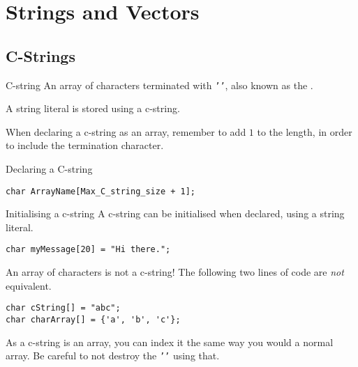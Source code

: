 \documentclass[\main/notes.tex]{subfiles}
\begin{document}
	\setcounter{chapter}{2}
	\chapter{Strings and Vectors}
		\section{C-Strings}
			\begin{definition}{C-string}
				An array of characters terminated with \texttt{'\0'}, also known as the .
			\end{definition}
			A string literal is stored using a c-string.

			When declaring a c-string as an array, remember to add $1$ to the length, in order to include the termination character.
			\begin{codebox}{Declaring a C-string}
				\begin{verbatim}
char ArrayName[Max_C_string_size + 1];
				\end{verbatim}
			\end{codebox}
			\begin{sidenote}{Initialising a c-string}
				A c-string can be initialised when declared, using a string literal.
				\begin{verbatim}
char myMessage[20] = "Hi there.";
				\end{verbatim}
			\end{sidenote}
			\begin{sidenote}{An array of characters is not a c-string!}
				The following two lines of code are \emph{not} equivalent.
				\begin{verbatim}
char cString[] = "abc";
char charArray[] = {'a', 'b', 'c'};
				\end{verbatim}
			\end{sidenote}
			\noindent As a c-string is an array, you can index it the same way you would a normal array. Be careful to not destroy the \texttt{'\0'} using that.
\end{document}
